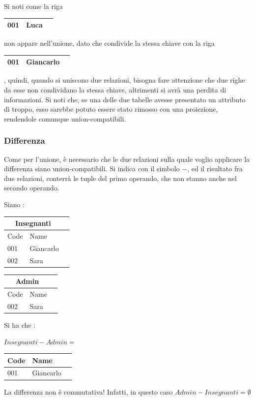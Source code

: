 \documentclass[12pt, letterpaper]{article}
\begin{document}
    Si noti come la riga 
    \begin{tabular}{|l|l|r|}
        \hline
        \color{red}001 & \color{red}Luca \\  \hline
    \end{tabular} 
non appare nell'unione, dato che condivide la stessa chiave con la riga 
\begin{tabular}{|l|l|r|}
    \hline
    \color{blue}001 & \color{blue}Giancarlo \\  \hline
\end{tabular} 
, quindi, quando si uniscono due relazioni, bisogna fare attenzione che due righe da esse non condividano 
la stessa chiave, altrimenti si avrà una perdita di informazioni. Si noti che, se una delle due tabelle avesse 
presentato un attributo di troppo, esso sarebbe potuto essere stato rimosso con una proiezione, rendendole comunque 
union-compatibili.
\subsubsection{Differenza}
Come per l'unione, è necessario che le due relazioni sulla quale voglio applicare la differenza siano 
union-compatibili. Si indica con il simbolo \(-\), ed il risultato fra due relazioni, conterrà 
le tuple del primo operando, che non stanno anche nel secondo operando.
\begin{center}
    Siano : 
    \begin{tabular}{|l|l|r|}
        \hline
    \multicolumn{2}{|c|}{\textbf{Insegnanti}}\\
        \hline
        Code & Name  \\
        \hline
        001 & Giancarlo  \\
        \hline
        002 & Sara  \\
        \hline
        \end{tabular}
        \begin{tabular}{|l|l|r|}
            \hline
        \multicolumn{2}{|c|}{\textbf{Admin}}\\
            \hline
            Code & Name  \\
            \hline
            002 & Sara  \\
            \hline
            \end{tabular}
 Si ha che :\end{center}\begin{center}
    \(Insegnanti-Admin =\)
    \begin{tabular}{|l|l|r|}
        \hline
        Code & Name  \\
        \hline
       
        001 & Giancarlo  \\
        \hline
        \end{tabular}
 \end{center}
 La differenza non è commutativa! Infatti, in questo caso \(Admin-Insegnanti=\emptyset \)
\newpage
\end{document}
